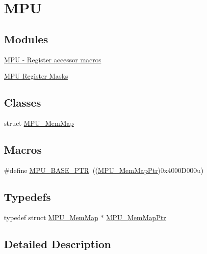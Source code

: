 \hypertarget{group___m_p_u___peripheral}{}\section{M\+PU}
\label{group___m_p_u___peripheral}
\subsection*{Modules}
\begin{DoxyCompactItemize}
\item 
\hyperlink{group___m_p_u___register___accessor___macros}{M\+P\+U -\/ Register accessor macros}
\item 
\hyperlink{group___m_p_u___register___masks}{M\+P\+U Register Masks}
\end{DoxyCompactItemize}
\subsection*{Classes}
\begin{DoxyCompactItemize}
\item 
struct \hyperlink{struct_m_p_u___mem_map}{M\+P\+U\+\_\+\+Mem\+Map}
\end{DoxyCompactItemize}
\subsection*{Macros}
\begin{DoxyCompactItemize}
\item 
\#define \hyperlink{group___m_p_u___peripheral_gae2d60f80178d84225d77e5f0214d1f1d}{M\+P\+U\+\_\+\+B\+A\+S\+E\+\_\+\+P\+TR}~((\hyperlink{group___m_p_u___peripheral_gac3cd3449552560380e80c90b2207d18b}{M\+P\+U\+\_\+\+Mem\+Map\+Ptr})0x4000\+D000u)
\end{DoxyCompactItemize}
\subsection*{Typedefs}
\begin{DoxyCompactItemize}
\item 
typedef struct \hyperlink{struct_m_p_u___mem_map}{M\+P\+U\+\_\+\+Mem\+Map} $\ast$ \hyperlink{group___m_p_u___peripheral_gac3cd3449552560380e80c90b2207d18b}{M\+P\+U\+\_\+\+Mem\+Map\+Ptr}
\end{DoxyCompactItemize}


\subsection{Detailed Description}


